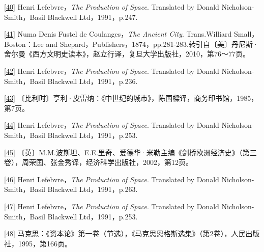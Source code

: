 \documentclass[UTF8, fontset = sourcesans, a4paper, oneside, zihao =
-4, scheme=chinese, no-math, space=true]{ctexbook}
\begin{document}
\protect\hypertarget{part0006_split_003.htmlux5cux23m40}{}{}\protect\hyperlink{part0006_split_003.htmlux5cux23w40}{{[}40{]}}
Henri Lefebvre，\emph{The Production of Space}. Translated by Donald
Nicholson-Smith，Basil Blackwell Ltd，1991，p.247.

\protect\hypertarget{part0006_split_003.htmlux5cux23m41}{}{}\protect\hyperlink{part0006_split_003.htmlux5cux23w41}{{[}41{]}}
Numa Denis Fustel de Coulanges，\emph{The Ancient City}. Trans.Williard
Small，Boston：Lee and
Shepard，Publishers，1874，pp.281-283.转引自〔美〕丹尼斯·舍尔曼《西方文明史读本》，赵立行译，复旦大学出版社，2010，第76～77页。

\protect\hypertarget{part0006_split_003.htmlux5cux23m42}{}{}\protect\hyperlink{part0006_split_003.htmlux5cux23w42}{{[}42{]}}
Henri Lefebvre，\emph{The Production of Space}. Translated by Donald
Nicholson-Smith，Basil Blackwell Ltd，1991，p.236.

\protect\hypertarget{part0006_split_003.htmlux5cux23m43}{}{}\protect\hyperlink{part0006_split_003.htmlux5cux23w43}{{[}43{]}}
〔比利时〕亨利·皮雷纳：《中世纪的城市》，陈国樑译，商务印书馆，1985，第7页。

\protect\hypertarget{part0006_split_003.htmlux5cux23m44}{}{}\protect\hyperlink{part0006_split_003.htmlux5cux23w44}{{[}44{]}}
Henri Lefebvre，\emph{The Production of Space}. Translated by Donald
Nicholson-Smith，Basil Blackwell Ltd，1991，p.253.

\protect\hypertarget{part0006_split_003.htmlux5cux23m45}{}{}\protect\hyperlink{part0006_split_003.htmlux5cux23w45}{{[}45{]}}
〔英〕M.M.波斯坦、E.E.里奇、爱德华·米勒主编《剑桥欧洲经济史》（第三卷），周荣国、张金秀译，经济科学出版社，2002，第12页。

\protect\hypertarget{part0006_split_003.htmlux5cux23m46}{}{}\protect\hyperlink{part0006_split_003.htmlux5cux23w46}{{[}46{]}}
Henri Lefebvre，\emph{The Production of Space}. Translated by Donald
Nicholson-Smith，Basil Blackwell Ltd，1991，p.263.

\protect\hypertarget{part0006_split_003.htmlux5cux23m47}{}{}\protect\hyperlink{part0006_split_003.htmlux5cux23w47}{{[}47{]}}
Henri Lefebvre，\emph{The Production of Space}. Translated by Donald
Nicholson-Smith，Basil Blackwell Ltd，1991，p.253.

\protect\hypertarget{part0006_split_003.htmlux5cux23m48}{}{}\protect\hyperlink{part0006_split_003.htmlux5cux23w48}{{[}48{]}}
马克思：《资本论》第一卷（节选），《马克思恩格斯选集》（第2卷），人民出版社，1995，第166页。
\end{document}
